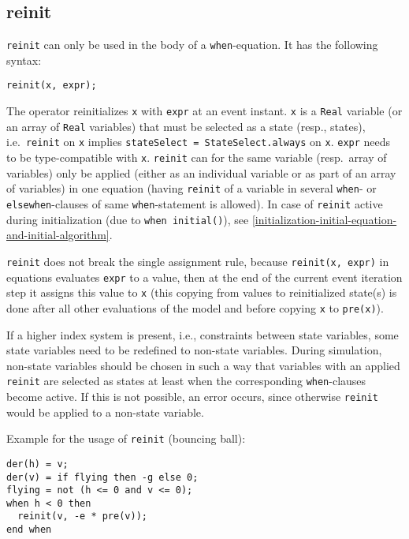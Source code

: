 \subsection{reinit}\label{reinit}

\lstinline!reinit! can only be used in the body of a \lstinline!when!-equation.
It has the following syntax:
\begin{lstlisting}[language=modelica]
reinit(x, expr);
\end{lstlisting}

The operator reinitializes \lstinline!x! with \lstinline!expr! at an event instant.
\lstinline!x! is a \lstinline!Real! variable (or an array of \lstinline!Real! variables) that must be selected as a state (resp., states), i.e.\ \lstinline!reinit! on \lstinline!x! implies \lstinline!stateSelect = StateSelect.always! on \lstinline!x!.
\lstinline!expr! needs to be type-compatible with \lstinline!x!.
\lstinline!reinit! can for the same variable (resp.\ array of variables) only be applied (either as an individual variable or as part of an array of variables) in one equation (having \lstinline!reinit! of a variable in several \lstinline!when!- or \lstinline!elsewhen!-clauses of same \lstinline!when!-statement is allowed).
In case of \lstinline!reinit! active during initialization (due to \lstinline!when initial()!), see \cref{initialization-initial-equation-and-initial-algorithm}.

\lstinline!reinit! does not break the single assignment rule, because \lstinline!reinit(x, expr)! in equations evaluates \lstinline!expr! to a value,
then at the end of the current event iteration step it assigns this value to \lstinline!x! (this copying from values to reinitialized state(s) is done after all other evaluations of the model and before copying \lstinline!x! to \lstinline!pre(x)!).

\begin{example}
If a higher index system is present, i.e., constraints between state variables, some state variables need to be redefined to non-state variables.
During simulation, non-state variables should be chosen in such a way that variables with an applied \lstinline!reinit! are selected as states at least when the corresponding \lstinline!when!-clauses become active.
If this is not possible, an error occurs, since otherwise \lstinline!reinit! would be applied to a non-state variable.

Example for the usage of \lstinline!reinit! (bouncing ball):
\begin{lstlisting}[language=modelica]
der(h) = v;
der(v) = if flying then -g else 0;
flying = not (h <= 0 and v <= 0);
when h < 0 then
  reinit(v, -e * pre(v));
end when
\end{lstlisting}
\end{example}

